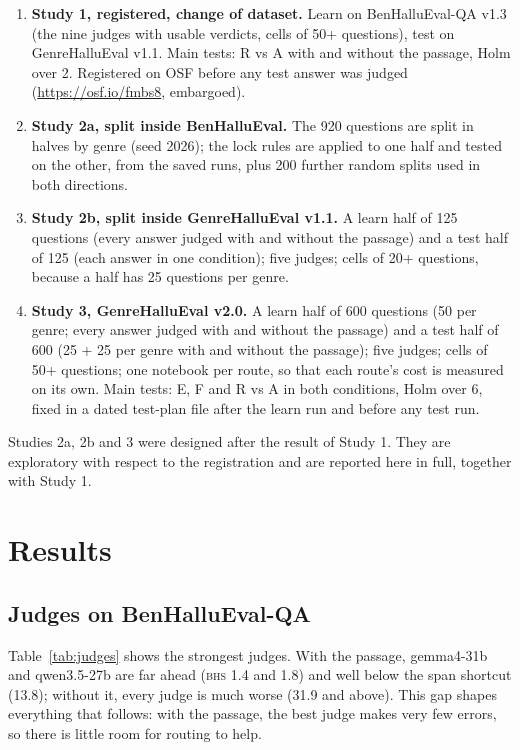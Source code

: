 \documentclass[11pt]{article}
\newcommand{\BHS}{\textsc{bhs}}
\begin{document}
\begin{enumerate}
  \item \textbf{Study 1, registered, change of dataset.} Learn on BenHalluEval-QA v1.3 (the nine judges with usable
  verdicts, cells of 50+ questions), test on GenreHalluEval v1.1. Main tests: R vs A with and without the passage, Holm over 2. Registered
  on OSF before any test answer was judged (\url{https://osf.io/fmbs8}, embargoed).
  \item \textbf{Study 2a, split inside BenHalluEval.} The 920 questions are split in halves by genre (seed 2026); the
  lock rules are applied to one half and tested on the other, from the saved runs, plus 200 further random splits
  used in both directions.
  \item \textbf{Study 2b, split inside GenreHalluEval v1.1.} A learn half of 125 questions (every answer judged with
  and without the passage) and a test half of 125 (each answer in one condition); five judges; cells of 20+ questions,
  because a half has 25 questions per genre.
  \item \textbf{Study 3, GenreHalluEval v2.0.} A learn half of 600 questions (50 per genre; every answer judged with and
  without the passage) and a test half of 600 (25 + 25 per genre with and without the passage); five judges; cells of
  50+ questions; one notebook per route, so that each route's cost is measured on its own. Main tests: E, F and R vs A
  in both conditions, Holm over 6, fixed in a dated test-plan file after the learn run and before any test run.
\end{enumerate}
Studies 2a, 2b and 3 were designed after the result of Study 1. They are exploratory with respect to the registration
and are reported here in full, together with Study 1.

\section{Results}\label{sec:results}

\subsection{Judges on BenHalluEval-QA}

Table~\ref{tab:judges} shows the strongest judges. With the passage, gemma4-31b and qwen3.5-27b are far ahead
(\BHS{} 1.4 and 1.8) and well below the span shortcut (13.8); without it, every judge is much worse (31.9 and above).
This gap shapes everything that follows: with the passage, the best judge makes very few errors, so there is little
room for routing to help.
\end{document}
